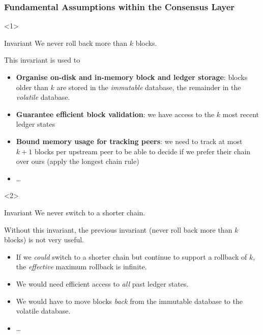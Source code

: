 \documentclass[usenames,dvipsnames,t]{beamer}
\begin{document}
\begin{frame}
\frametitle{Fundamental Assumptions within the Consensus Layer}


\begin{onlyenv}<1>

\begin{alertblock}{Invariant}
We never roll back more than $k$ blocks.
\end{alertblock}

This invariant is used to

\begin{itemize}
\item \textbf{Organise on-disk and in-memory block and ledger storage}: blocks older
than $k$ are stored in the \emph{immutable} database, the remainder in the
\emph{volatile} database.
\item \textbf{Guarantee efficient block validation}: we have access to the $k$
most recent ledger states
\item \textbf{Bound memory usage for tracking peers}: we need to track at most $k + 1$
blocks per upstream peer to be able to decide if we prefer their chain over
ours (apply the longest chain rule)
\item \dots
\end{itemize}

\end{onlyenv}


\begin{onlyenv}<2>
\begin{alertblock}{Invariant}
We never switch to a shorter chain.
\end{alertblock}

\pause

Without this invariant, the previous invariant (never roll back
more than $k$ blocks) is not very useful.

\begin{itemize}
\item If we \emph{could} switch to a shorter chain but continue to support a
rollback of $k$, the \emph{effective} maximum rollback is infinite.
\item We would need efficient access to \emph{all} past ledger states.
\item We would have to move blocks \emph{back} from the immutable database to the volatile database.
\item \dots
\end{itemize}
\end{onlyenv}


\end{frame}
\end{document}
